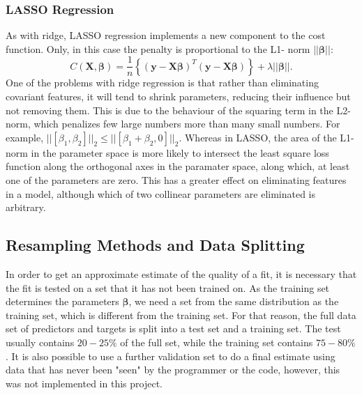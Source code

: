 \documentclass[11pt,a4paper,titlepage]{article}
\begin{document}
\subsubsection{LASSO Regression}
As with ridge, LASSO regression implements a new component to the cost function. Only, in this case the penalty is proportional to the L1- norm $\vert\vert \boldsymbol{\beta}\vert\vert$:
\begin{equation*}
    C(\boldsymbol{X},\boldsymbol{\beta})=\frac{1}{n}\left\{(\boldsymbol{y}-\boldsymbol{X}\boldsymbol{\beta})^T(\boldsymbol{y}-\boldsymbol{X}\boldsymbol{\beta})\right\}+\lambda\vert\vert \boldsymbol{\beta}\vert\vert.
\end{equation*}
One of the problems with ridge regression is that rather than eliminating covariant features, it will tend to shrink parameters, reducing their influence but not removing them. This is due to the behaviour of the squaring term in the L2- norm, which penalizes few large numbers more than many small numbers. For example, $\vert\vert[\beta_1,\beta_2]\vert\vert_2 \leq \vert\vert[\beta_1+\beta_2,0]\vert\vert_2$. Whereas in LASSO, the area of the L1- norm in the parameter space is more likely to intersect the least square loss function along the orthogonal axes in the paramater space, along which, at least one of the parameters are zero. This has a greater effect on eliminating features in a model, although which of two collinear parameters are eliminated is arbitrary.
\subsection{Resampling Methods and Data Splitting}
In order to get an approximate estimate of the quality of a fit, it is necessary that the fit is tested on a set that it has not been trained on. As the training set determines the parameters $\bm{\beta}$, we need a set from the same distribution as the training set, which is different from the training set. For that reason, the full data set of predictors and targets is split into a test set and a training set. The test usually contains $20-25\%$ of the full set, while the training set contains $75-80\%$. It is also possible to use a further validation set to do a final estimate using data that has never been "seen" by the programmer or the code, however, this was not implemented in this project.
\end{document}

